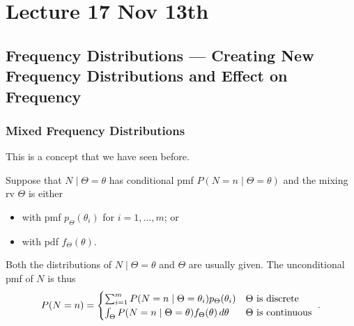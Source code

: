 \documentclass[notoc,notitlepage]{tufte-book}
\begin{document}




\chapter{Lecture 17 Nov 13th}%
\label{chp:lecture_17_nov_13th}

\section{Frequency Distributions --- Creating New Frequency Distributions and Effect on Frequency}%
\label{sec:frequency_distributions_creating_new_frequency_distributions_and_effect_on_frequency}

\subsection{Mixed Frequency Distributions}%
\label{sub:mixed_frequency_distributions}

This is a concept that we have seen before.

Suppose that $N \mid \Theta = \theta$ has conditional pmf $P(N = n \mid \Theta = \theta)$ and the mixing rv $\Theta$ is either
\begin{itemize}
  \item {} with pmf $p_\Theta(\theta_i)$ for $i = 1, \ldots, m$; or
  \item {} with pdf $f_\Theta(\theta)$.
\end{itemize}
Both the distributions of $N \mid \Theta = \theta$ and $\Theta$ are usually given. The unconditional pmf of $N$ is thus
\begin{equation*}
  P(N = n) = \begin{cases}
    \sum_{i=1}^{m} P(N = n \mid \Theta = \theta_i) p_\Theta(\theta_i) & \Theta \text{ is discrete } \\
    \int_{\Theta} P(N = n \mid \Theta = \theta) f_\Theta(\theta) \mathop{}\!d{\theta} & \Theta \text{ is continuous }
  \end{cases}.
\end{equation*}
\end{document}
